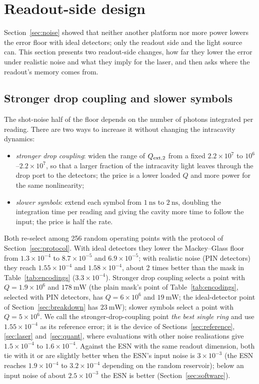\section{Readout-side design}\label{sec:readout}

Section~\ref{sec:noise} showed that neither another platform nor more power lowers the error floor with ideal detectors; only the
readout side and the light source can. This section presents two readout-side changes, how far they lower the error under realistic
noise and what they imply for the laser, and then asks where the readout's memory comes from.

\subsection{Stronger drop coupling and slower symbols}

The shot-noise half of the floor depends on the number of photons integrated per reading. There are two ways to increase it without
changing the intracavity dynamics:
\begin{itemize}
\item \emph{stronger drop coupling}: widen the range of $Q_{\mathrm{ext},2}$ from a fixed $2.2\times10^{7}$ to $10^{6}$--$2.2\times10^{7}$, so that
      a larger fraction of the intracavity light leaves through the drop port to the detectors; the price is a lower loaded $Q$ and
      more power for the same nonlinearity;
\item \emph{slower symbols}: extend each symbol from $1~\mathrm{ns}$ to $2~\mathrm{ns}$, doubling the integration time per reading and
      giving the cavity more time to follow the input; the price is half the rate.
\end{itemize}
Both re-select among 256 random operating points with the protocol of Section~\ref{sec:protocol}. With ideal detectors they lower
the Mackey--Glass floor from $1.3\times10^{-4}$ to $8.7\times10^{-5}$ and $6.9\times10^{-5}$; with realistic noise (PIN detectors)
they reach $1.55\times10^{-4}$ and $1.58\times10^{-4}$, about 2 times better than the mask in Table~\ref{tab:encodings}
($3.3\times10^{-4}$). Stronger drop coupling selects a point with $Q=1.9\times10^{6}$ and $178~\mathrm{mW}$ (the plain mask's point of
Table~\ref{tab:encodings}, selected with PIN detectors, has $Q=6\times10^{6}$ and $19~\mathrm{mW}$; the ideal-detector point of
Section~\ref{sec:breakdown} has $23~\mathrm{mW}$); slower symbols select a point with $Q=5\times10^{6}$. We call the stronger-drop-coupling
point \emph{the best single ring} and use $1.55\times10^{-4}$ as its reference error; it is the device of Sections~\ref{sec:reference},
\ref{sec:laser} and~\ref{sec:quant}, where evaluations with other noise realisations give $1.5\times10^{-4}$ to $1.6\times10^{-4}$.
Against the ESN with the same readout dimension, both tie with it or are slightly better when the ESN's input noise is
$3\times10^{-3}$ (the ESN reaches $1.9\times10^{-4}$ to $3.2\times10^{-4}$ depending on the random reservoir); below an input noise of
about $2.5\times10^{-3}$ the ESN is better (Section~\ref{sec:software}).

